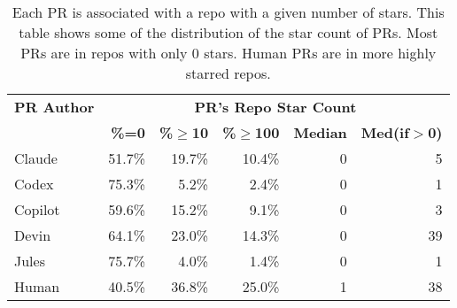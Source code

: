 
\begin{table}[h]
\centering
\begin{tabular}{@{}l r r r r r@{}}
\hline
\textbf{PR Author} & \multicolumn{5}{c}{\textbf{PR's Repo Star Count}} \\
\cmidrule(l){2-6}
 & \textbf{\%=0} & \textbf{\%$\geq$10} & \textbf{\%$\geq$100} & \textbf{Median} & \textbf{Med(if$>$0)} \\
\hline
Claude & 51.7\% & 19.7\% & 10.4\% & 0 & 5 \\
Codex & 75.3\% & 5.2\% & 2.4\% & 0 & 1 \\
Copilot & 59.6\% & 15.2\% & 9.1\% & 0 & 3 \\
Devin & 64.1\% & 23.0\% & 14.3\% & 0 & 39 \\
Jules & 75.7\% & 4.0\% & 1.4\% & 0 & 1 \\
\hdashline
Human & 40.5\% & 36.8\% & 25.0\% & 1 & 38 \\
\hline
\end{tabular}
\caption{Each PR is associated with a repo with a given number of stars. This table shows some of the distribution of the star count of PRs. Most PRs are in repos with only 0 stars. Human PRs are in more highly starred repos.}
\label{tab:repo_stars}
\end{table}